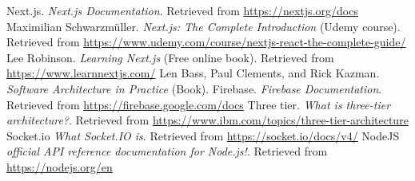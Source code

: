 \renewcommand\bibname{Ашигласан материал}
\begin{thebibliography}{99}	
	Next.js. \textit{Next.js Documentation}. Retrieved from \url{https://nextjs.org/docs}
	Maximilian Schwarzmüller. \textit{Next.js: The Complete Introduction} (Udemy course). Retrieved from \url{https://www.udemy.com/course/nextjs-react-the-complete-guide/}
	Lee Robinson. \textit{Learning Next.js} (Free online book). Retrieved from \url{https://www.learnnextjs.com/}
	Len Bass, Paul Clements, and Rick Kazman. \textit{Software Architecture in Practice} (Book).
	Firebase. \textit{Firebase Documentation}. Retrieved from \url{https://firebase.google.com/docs}	
	Three tier. \textit{What is three-tier architecture?}. Retrieved from \url{https://www.ibm.com/topics/three-tier-architecture}	
	Socket.io \textit{What Socket.IO is}. Retrieved from \url{https://socket.io/docs/v4/}	
	NodeJS \textit{official API reference documentation for Node.js!}. Retrieved from \url{https://nodejs.org/en}	
\end{thebibliography}